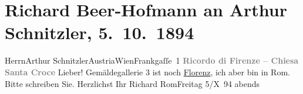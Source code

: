

         
         \renewcommand{\erwaehntePersonen}{Personen: Richard Beer-Hofmann}
         \renewcommand{\erwaehnteOrte}{Orte: Florenz, Frankgasse 1, IX., Alsergrund, Rom, Santa Croce, Wien, Österreich}
         \renewcommand{\erwaehnteWerke}{}
               \section[Richard Beer-Hofmann an Arthur Schnitzler, 5. 10. 1894]{ Richard Beer-Hofmann an Arthur Schnitzler, 5. 10. 1894}\nopagebreak{}\rehead{ }\begin{ledgroupsized}[t]{13cm}\normalsize\beginnumbering \toendnotes[C]{\smallbreak\pagebreak[2]} 
\pstart{}{\pb}Herrn\pend{}\pstart{}Arthur Schnitzler\pend{}\pstart{}Austria\pend{}\pstart{}Wien\pend{}\pstart{}Frankgaſſe 1\pend{}{\bigskip}\pstart
           \noindent{}\centering{}\textcolor{gray}{\textbf{{\pb}Ricordo di Firenze – Chiesa Santa
                        Croce}}\pend
           \pstart
           Lieber! Gemäldegallerie 3 ist noch \uline{Florenz}, ich aber bin in Rom. Bitte schreiben Sie.
               Herzlichst Ihr\pend
           \pstart \spacefill\mbox{Richard}\pend{}\pstart
           RomFreitag 5/X 94{ }abends\pend
           
         
         \endnumbering{}\end{ledgroupsized}  \newcommand{\dateiname}{L00377}\newcommand{\titel}{Richard Beer-Hofmann an Arthur Schnitzler, 5. 10. 1894}\newcommand{\editorInnen}{Martin Anton Müller und Gerd-Hermann Susen}
      